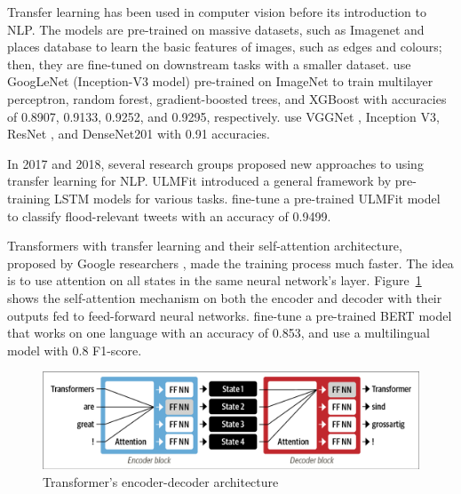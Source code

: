 Transfer learning has been used in computer vision before its introduction to \ac{NLP}. The models
are pre-trained on massive datasets, such as Imagenet
\cite{krizhevskyImageNetClassificationDeep2017} and places database
\cite{zhouLearningDeepFeatures2014} to learn the basic features of images, such as edges and
colours; then, they are fine-tuned on downstream tasks with a smaller dataset.
 use GoogLeNet (Inception-V3 model) \cite{7780677}
pre-trained on ImageNet to train multilayer perceptron, random forest, gradient-boosted trees, and
XGBoost with accuracies of 0.8907, 0.9133, 0.9252, and 0.9295, respectively.
 use VGGNet \cite{simonyanVeryDeepConvolutional2015},
Inception V3, ResNet \cite{heDeepResidualLearning2015}, and DenseNet201
\cite{huangDenselyConnectedConvolutional2018} with 0.91 accuracies.

In 2017 and 2018, several research groups proposed new approaches to using transfer learning for
\ac{NLP}. \ac{ULMFit} \cite{howardUniversalLanguageModel2018} introduced a general framework by
pre-training \ac{LSTM} models for various tasks.
 fine-tune a pre-trained \ac{ULMFit} model
to classify flood-relevant tweets with an accuracy of 0.9499. 

Transformers with transfer learning and their self-attention architecture, proposed by Google
researchers \cite{vaswaniAttentionAllYou2017}, made the training process much faster. The idea is to
use attention on all states in the same neural network's layer.
Figure~\ref{fig:encoder_decoder_transformer} shows the self-attention mechanism on both the encoder
and decoder with their outputs fed to feed-forward neural networks.
 fine-tune a pre-trained \ac{BERT}
\cite{devlinBERTPretrainingDeep2019}  model that works on one language with an accuracy of 0.853,
and  use a multilingual model with 0.8 F1-score.

\begin{figure}[H]
\begin{center}
  \includegraphics[width=12cm, trim={0.1cm 0.1cm 0.1cm 0.1cm},clip]{./images/encoder-decoder_transformer.png}
\end{center}
\caption{Transformer's encoder-decoder architecture \cite{tunstallNaturalLanguageProcessing2022}}
\label{fig:encoder_decoder_transformer}
\end{figure}


